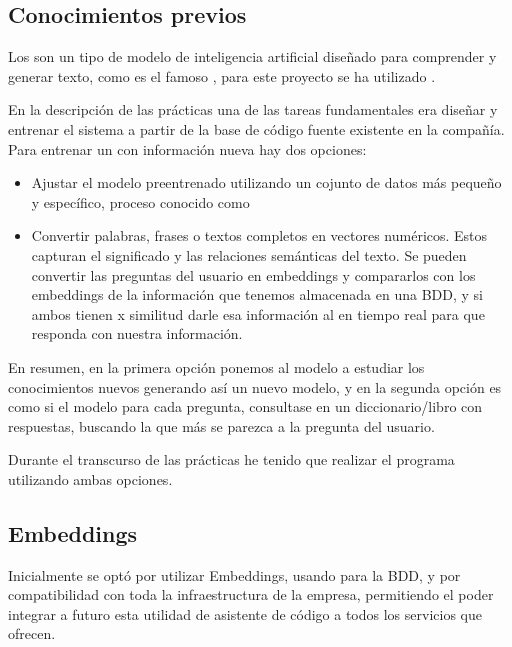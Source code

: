 \subsection{Conocimientos previos}
Los \href{https://en.wikipedia.org/wiki/Large_language_model}{} son un tipo de modelo de inteligencia artificial diseñado para comprender y generar texto, como es el famoso \href{https://es.wikipedia.org/wiki/GPT-4}{}, para este proyecto se ha utilizado \href{https://ollama.com/}{}.

En la descripción de las prácticas una de las tareas fundamentales era diseñar y entrenar el sistema a partir de la base de código fuente existente en la
compañía. Para entrenar un \href{https://en.wikipedia.org/wiki/Large_language_model}{} con información nueva hay dos opciones:
\begin{itemize}
    \item Ajustar el modelo preentrenado utilizando un cojunto de datos más pequeño y específico, proceso conocido como 
    \item Convertir palabras, frases o textos completos en vectores numéricos. Estos  capturan el significado y las relaciones semánticas del texto. Se pueden convertir las preguntas del usuario en embeddings y compararlos con los embeddings de la información que tenemos almacenada en una BDD, y si ambos tienen x similitud darle esa información al \href{https://en.wikipedia.org/wiki/Large_language_model}{} en tiempo real para que responda con nuestra información.
\end{itemize}



En resumen, en la primera opción ponemos al modelo a estudiar los conocimientos nuevos generando así un nuevo modelo, y en la segunda opción es como si el modelo para cada pregunta, consultase en un diccionario/libro con respuestas, buscando la que más se parezca a la pregunta del usuario.  

Durante el transcurso de las prácticas he tenido que realizar el programa utilizando ambas opciones.

\newpage
\subsection{Embeddings}
Inicialmente se optó por utilizar Embeddings, usando \href{https://www.sqlite.org/}{} para la BDD, y \href{https://dotnet.microsoft.com/es-es/languages/csharp}{} por compatibilidad con toda la infraestructura de la empresa, permitiendo el poder integrar a futuro esta utilidad de asistente de código a todos los servicios que ofrecen.

